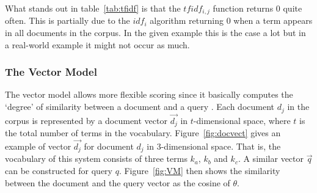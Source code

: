 What stands out in table~\ref{tab:tfidf} is that the $tfidf_{i,j}$ function returns \num{0} quite often. This is partially due to the $idf_i$ algorithm returning \num{0} when a term appears in all documents in the corpus. In the given example this is the case a lot but in a real-world example it might not occur as much.


\subsubsection{The Vector Model}

The vector model allows more flexible scoring since it basically computes the `degree' of similarity between a document and a query \autocite{Baeza-Yates2011}. Each document $d_j$ in the corpus is represented by a document vector $\vec{d_j}$ in $t$-dimensional space, where $t$ is the total number of terms in the vocabulary. Figure~\ref{fig:docvect} gives an example of vector $\vec{d_j}$ for document $d_j$ in 3-dimensional space. That is, the vocabulary of this system consists of three terms $k_a$, $k_b$ and $k_c$. A similar vector $\vec{q}$ can be constructed for query $q$. Figure~\ref{fig:VM} then shows the similarity between the document and the query vector as the cosine of $\theta$.

